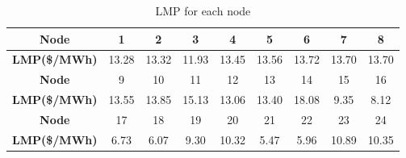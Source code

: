 \begin{table}[h]
    \centering
    \begin{tabular}{|c|c|c|c|c|c|c|c|c|}
    \hline
      \textbf{Node}   &  1 & 2 & 3& 4& 5& 6& 7 & 8\\
      \hline
        \textbf{LMP(\$/MWh)} & 13.28&13.32&11.93&13.45&13.56&13.72&13.70&13.70\\
        \hline
        \textbf{Node} & 9 &10&11&12&13&14&15&16\\
        \hline
        \textbf{LMP(\$/MWh)} & 13.55 & 13.85&   15.13 &  13.06&   13.40 &  18.08&   9.35 &  8.12\\
                \hline
        \textbf{Node} &17&18&19&20&21&22&23&24\\
        \hline
        \textbf{LMP(\$/MWh)} & 6.73 & 6.07  &9.30&  10.32 & 5.47&  5.96 & 10.89 & 10.35\\
        \hline
    \end{tabular}
    \caption{LMP for each node}
    \label{tab:1lmp}
\end{table}


